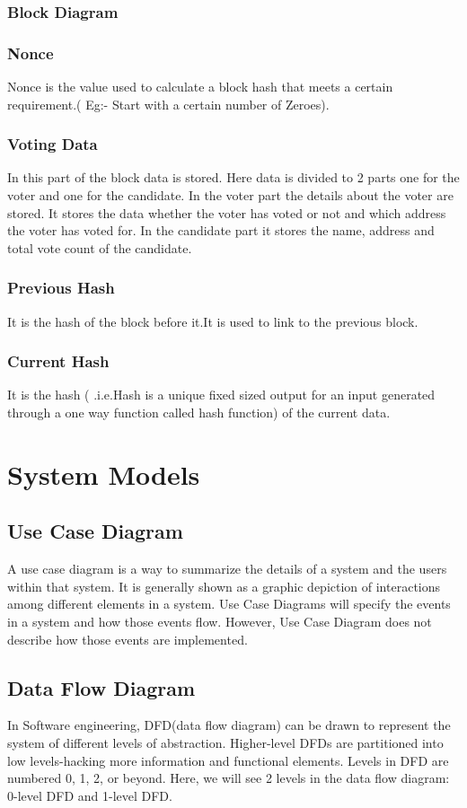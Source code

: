 \documentclass[a4paper,12pt]{report}
\begin{document}
\subsubsection{Block Diagram}
\subsubsection{Nonce}
Nonce is the value used to calculate a block hash that meets a certain requirement.( Eg:- Start with a certain number of Zeroes).
\subsubsection{Voting Data}
In this part of the block data is stored. Here data is divided to 2 parts one for the voter and one for the candidate. In the voter part the details about the voter are stored. It stores the data whether the voter has voted or not and which address the voter has voted for. In the candidate part it stores the name, address and total vote count of the candidate.
\subsubsection{Previous Hash}
It is the hash of the block before it.It is used to link to the previous block.
\subsubsection{Current Hash}
It is the hash ( .i.e.Hash is a unique fixed sized output for an input generated through a one way function called hash function) of the current data.
\section{System Models}
\subsection{Use Case Diagram}
A use case diagram is a way to summarize the details of a system and the users within that system. It is generally shown as a graphic depiction of interactions among different elements in a system. Use Case Diagrams will specify the events in a system and how those events flow. However, Use Case Diagram does not describe how those events are implemented.
\subsection{Data Flow Diagram}
In Software engineering, DFD(data flow diagram) can be drawn to represent the system of different levels of abstraction. Higher-level DFDs are partitioned into low levels-hacking more information and functional elements. Levels in DFD are numbered 0, 1, 2, or beyond. Here, we will see 2 levels in the data flow diagram: 0-level DFD and 1-level DFD.
\end{document}
